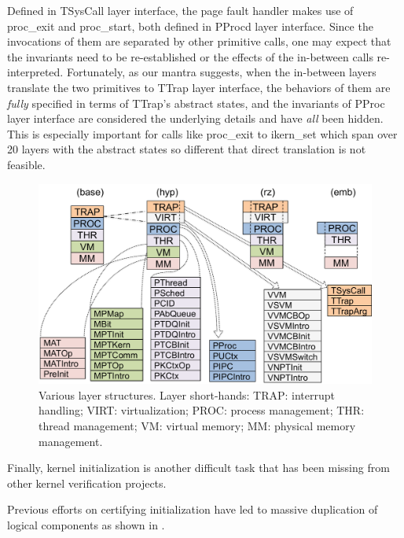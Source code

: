 {Defined in \textsf{TSysCall} layer interface, the page fault handler makes use of
\textsf{proc\_exit} and \textsf{proc\_start}, both defined in \textsf{PProc}d layer interface.
Since the invocations of them are separated by other primitive calls,
one may expect that the invariants need to be re-established or
the effects of the in-between calls re-interpreted.
Fortunately, as our mantra suggests, when the in-between layers translate
the two primitives to \textsf{TTrap} layer interface, the behaviors of them are
\emph{fully} specified in terms of \textsf{TTrap}'s abstract states,
and the invariants of \textsf{PProc} layer interface are considered the underlying
details and have \emph{all} been hidden.
This is especially important for calls like \textsf{proc\_exit} to
\textsf{ikern\_set} which span over 20 layers with the abstract states
so different that direct translation is not feasible.

\begin{figure}[t]
\centering
\includegraphics[scale=0.5]{figs/layers2} 
\caption{Various \mCTOS{} layer structures.
Layer short-hands: TRAP: interrupt handling; VIRT: virtualization;
PROC: process management; THR: thread management;
VM: virtual memory; MM: physical memory management.}
\label{fig:kernel-layers}
\hrulefill
\end{figure}

Finally, kernel initialization is another difficult task
that has been missing from other kernel verification projects.

Previous efforts on certifying initialization have led to massive duplication
of logical components as shown in \cite{vaynberg12}.

}

